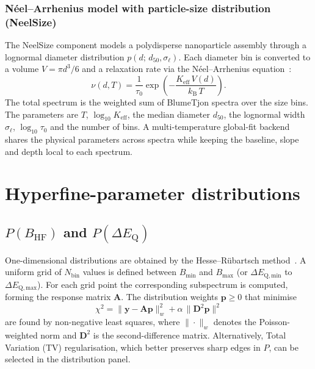 \documentclass[smallcondensed]{svjour3}
\begin{document}
\subsubsection{Néel--Arrhenius model with particle-size distribution (NeelSize)}
\label{sec:neelsize}

The NeelSize component models a polydisperse nanoparticle assembly through a
lognormal diameter distribution $p(d;\,d_{50},\sigma_\ell)$. Each diameter
bin is converted to a volume $V = \pi d^3/6$ and a relaxation rate via the
Néel--Arrhenius equation~\cite{neel1949,brown1963}:
\begin{equation}
  \nu(d,T) = \frac{1}{\tau_0}
             \exp\!\left(-\frac{K_\mathrm{eff}\,V(d)}{k_\mathrm{B}\,T}\right).
\end{equation}
The total spectrum is the weighted sum of BlumeTjon spectra over the size
bins. The parameters are $T$, $\log_{10}K_\mathrm{eff}$, the median diameter
$d_{50}$, the lognormal width $\sigma_\ell$, $\log_{10}\tau_0$ and the
number of bins. A multi-temperature global-fit backend shares the physical
parameters across spectra while keeping the baseline, slope and depth local
to each spectrum.

\section{Hyperfine-parameter distributions}
\label{sec:distributions}

\subsection{\texorpdfstring{$P(B_\mathrm{HF})$ and $P(\Delta E_\mathrm{Q})$}{P(BHF) and P(dEQ)}}
\label{sec:pbhf}

One-dimensional distributions are obtained by the Hesse--Rübartsch
method~\cite{hesse1974}. A uniform grid of $N_\mathrm{bin}$ values is
defined between $B_\mathrm{min}$ and $B_\mathrm{max}$ (or
$\Delta E_{\mathrm{Q},\mathrm{min}}$ to $\Delta E_{\mathrm{Q},\mathrm{max}}$).
For each grid point the corresponding subspectrum is computed, forming the
response matrix $\mathbf{A}$. The distribution weights $\mathbf{p} \geq 0$
that minimise
\begin{equation}
  \chi^2 =
  \|\mathbf{y} - \mathbf{A}\mathbf{p}\|_w^2
  + \alpha\,\|\mathbf{D}^2\mathbf{p}\|^2
  \label{eq:tikhonov}
\end{equation}
are found by non-negative least squares, where $\|\cdot\|_w$ denotes the
Poisson-weighted norm and $\mathbf{D}^2$ is the second-difference matrix.
Alternatively, Total Variation (TV) regularisation, which better preserves
sharp edges in $P$, can be selected in the distribution panel.
\end{document}
